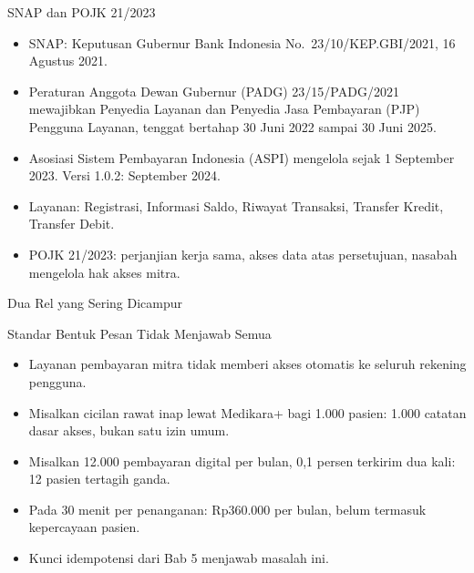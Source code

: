 \documentclass[aspectratio=169, table, 12pt]{beamer}
\begin{document}
\begin{frame}{{\Large SNAP dan POJK 21/2023}}
  \vspace{8pt}
  \begin{itemize}
    \item SNAP: Keputusan Gubernur Bank Indonesia No.~23/10/KEP.GBI/2021, 16 Agustus 2021.
    \item Peraturan Anggota Dewan Gubernur (PADG) 23/15/PADG/2021 mewajibkan Penyedia Layanan dan Penyedia Jasa Pembayaran (PJP) Pengguna Layanan, tenggat bertahap 30 Juni 2022 sampai 30 Juni 2025.
    \item Asosiasi Sistem Pembayaran Indonesia (ASPI) mengelola sejak 1 September 2023. Versi 1.0.2: September 2024.
    \item Layanan: Registrasi, Informasi Saldo, Riwayat Transaksi, Transfer Kredit, Transfer Debit.
    \item POJK 21/2023: perjanjian kerja sama, akses data atas persetujuan, nasabah mengelola hak akses mitra.
  \end{itemize}
\end{frame}

\begin{frame}{{\Large Dua Rel yang Sering Dicampur}}
  \centering
\end{frame}

\begin{frame}{{\Large Standar Bentuk Pesan Tidak Menjawab Semua}}
  \vspace{8pt}
  \begin{itemize}
    \item Layanan pembayaran mitra tidak memberi akses otomatis ke seluruh rekening pengguna.
    \item Misalkan cicilan rawat inap lewat Medikara+ bagi 1.000 pasien: 1.000 catatan dasar akses, bukan satu izin umum.
    \item Misalkan 12.000 pembayaran digital per bulan, 0,1 persen terkirim dua kali: 12 pasien tertagih ganda.
    \item Pada 30 menit per penanganan: Rp360.000 per bulan, belum termasuk kepercayaan pasien.
    \item Kunci idempotensi dari Bab 5 menjawab masalah ini.
  \end{itemize}
\end{frame}
\end{document}
